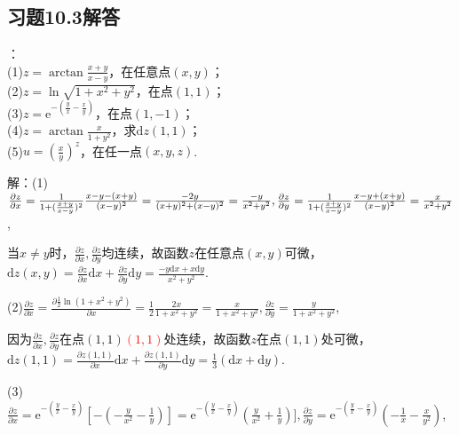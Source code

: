 \documentclass[12pt,UTF8]{ctexart}
\begin{document}
\subsection{习题10.3解答}
\begin{enumerate}
：
\\
(1)$z=\arctan\frac{x+y}{x-y}$，在任意点$(x,y)$；
\\
(2)$z=\ln\sqrt{1+x^2+y^2}$，在点$(1,1)$；
\\
(3)$z=\mathrm e^{-(\frac yx-\frac xy)}$，在点$(1,-1)$；
\\
(4)$z=\arctan\frac x{1+y^2}$，求$\mathrm dz(1,1)$；
\\
(5)$u=(\frac xy)^z$，在任一点$(x,y,z)$.

解：(1)$\frac{\partial z}{\partial x}=\frac1{1+(\frac{x+y}{x-y})^2}\frac{x-y-(x+y)}{(x-y)^2}=\frac{-2y}{(x+y)^2+(x-y)^2}=\frac{-y}{x^2+y^2},\\
\frac{\partial z}{\partial y}=\frac1{1+(\frac{x+y}{x-y})^2}\frac{x-y+(x+y)}{(x-y)^2}=\frac x{x^2+y^2}$,

当$x\neq y$时，$\frac{\partial z}{\partial x},\frac{\partial z}{\partial y}$均连续，故函数$z$在任意点$(x,y)$可微，\\
$\mathrm dz(x,y)=\frac{\partial z}{\partial x}\mathrm dx+\frac{\partial z}{\partial y}\mathrm dy=\frac{-y\mathrm dx+x\mathrm dy}{x^2+y^2}$.

(2)$\frac{\partial z}{\partial x}=\frac{\partial\frac12\ln(1+x^2+y^2)}{\partial x}=\frac12\frac{2x}{1+x^2+y^2}=\frac x{1+x^2+y^2},\frac{\partial z}{\partial y}=\frac y{1+x^2+y^2}$,

因为$\frac{\partial z}{\partial x},\frac{\partial z}{\partial y}$在点$(1,1)$\textcolor{red}{$(1,1)$}\footnotemark{}处连续，故函数$z$在点$(1,1)$处可微，\\
$\mathrm dz(1,1)=\frac{\partial z(1,1)}{\partial x}\mathrm dx+\frac{\partial z(1,1)}{\partial y}\mathrm dy=\frac13(\mathrm dx+\mathrm dy)$.

(3)$\frac{\partial z}{\partial x}=\mathrm e^{-(\frac yx-\frac xy)}[-(-\frac y{x^2}-\frac1y)]=\mathrm e^{-(\frac yx-\frac xy)}(\frac y{x^2}+\frac1y)],\frac{\partial z}{\partial y}=\mathrm e^{-(\frac yx-\frac xy)}(-\frac1x-\frac x{y^2})$,


\end{enumerate}
\end{document}
